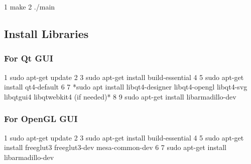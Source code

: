 
\begin{DoxyCode}
1 make
2 ./main
\end{DoxyCode}


\subsection*{Install Libraries}

\subsubsection*{For Qt G\+UI}


\begin{DoxyCode}
1 sudo apt-get update
2 
3 sudo apt-get install build-essential
4 
5 sudo apt-get install qt4-default
6 
7 *sudo apt install libqt4-designer libqt4-opengl libqt4-svg libqtgui4 libqtwebkit4 (if needed)*
8 
9 sudo apt-get install libarmadillo-dev
\end{DoxyCode}


\subsubsection*{For Open\+GL G\+UI}


\begin{DoxyCode}
1 sudo apt-get update
2 
3 sudo apt-get install build-essential
4 
5 sudo apt-get install freeglut3 freeglut3-dev mesa-common-dev
6 
7 sudo apt-get install libarmadillo-dev
\end{DoxyCode}
 
